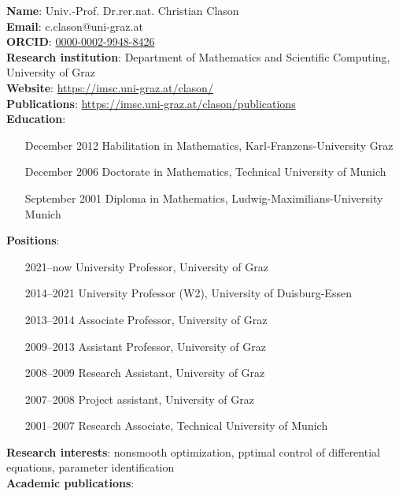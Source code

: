 \documentclass[a4paper,11pt]{scrartcl}
\begin{document}
\textbf{Name}:  Univ.-Prof. Dr.rer.nat.  Christian Clason  \\
\textbf{Email}: c.clason@uni-graz.at \\
\textbf{ORCID}: \href{https://orcid.org/0000-0002-9948-8426}{0000-0002-9948-8426} \\
\textbf{Research institution}: Department of Mathematics and Scientific Computing, University of Graz \\
\textbf{Website}: \url{https://imsc.uni-graz.at/clason/} \\
\textbf{Publications}: \url{https://imsc.uni-graz.at/clason/publications} \\
\textbf{Education}:
\begin{enumerate}[leftmargin=2.5cm]
    \item[December 2012] Habilitation in Mathematics, Karl-Franzens-University Graz
    \item[December 2006] Doctorate in Mathematics, Technical University of Munich
    \item[September 2001] Diploma in Mathematics, Ludwig-Maximilians-University Munich
\end{enumerate}
\textbf{Positions}:
\begin{enumerate}[leftmargin=2.5cm]
    \item[2021--now] University Professor, University of Graz
    \item[2014--2021] University Professor (W2), University of Duisburg-Essen
    \item[2013--2014] Associate Professor, University of Graz
    \item[2009--2013] Assistant Professor, University of Graz
    \item[2008--2009] Research Assistant, University of Graz
    \item[2007--2008] Project assistant, University of Graz
    \item[2001--2007] Research Associate, Technical University of Munich
\end{enumerate}
\textbf{Research interests}: nonsmooth optimization, pptimal control of differential equations, parameter identification \\
\textbf{Academic publications}:
\end{document}
